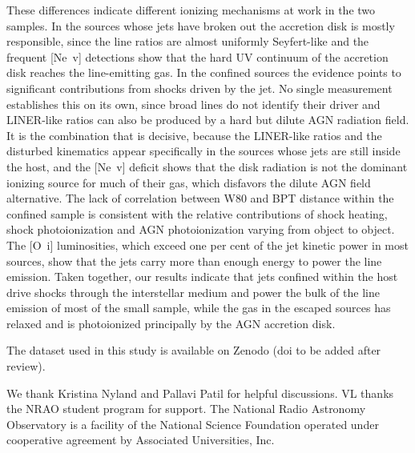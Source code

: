 \documentclass[linenumbers,trackchanges]{aastex701}
\begin{document}
These differences indicate different ionizing mechanisms at work in the two samples. In the sources whose jets have broken out the accretion disk is mostly responsible, since the line ratios are almost uniformly Seyfert-like and the frequent [Ne~{\sc v}] detections show that the hard UV continuum of the accretion disk reaches the line-emitting gas. In the confined sources the evidence points to significant contributions from shocks driven by the jet. No single measurement establishes this on its own, since broad lines do not identify their driver and LINER-like ratios can also be produced by a hard but dilute AGN radiation field. It is the combination that is decisive, because the LINER-like ratios and the disturbed kinematics appear specifically in the sources whose jets are still inside the host, and the [Ne~{\sc v}] deficit shows that the disk radiation is not the dominant ionizing source for much of their gas, which disfavors the dilute AGN field alternative. 
The lack of correlation between W80 and BPT distance within the confined sample is consistent with the relative contributions of shock heating, shock photoionization and AGN photoionization varying from object to object.
The [O~{\sc i}] luminosities, which exceed one per cent of the jet kinetic power in most sources, show that the jets carry more than enough energy to power the line emission. 
Taken together, our results indicate that jets confined within the host drive shocks through the interstellar medium and power the bulk of the line emission of most of the small sample, while the gas in the escaped sources has relaxed and is photoionized principally by the AGN accretion disk.


The dataset used in this study is available on Zenodo (doi to be added after review).

\begin{acknowledgments}
We thank Kristina Nyland and Pallavi Patil for helpful discussions. VL thanks the NRAO student program for support. The National Radio Astronomy Observatory is a facility of the National Science Foundation operated under cooperative agreement by Associated Universities, Inc.
\end{acknowledgments}
\end{document}
